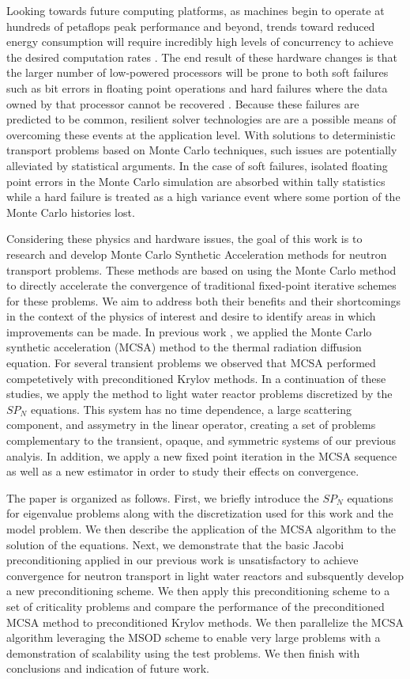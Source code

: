 \documentclass[letterpaper,11pt]{article}
\begin{document}
Looking towards future computing platforms, as machines begin to
operate at hundreds of petaflops peak performance and beyond, trends
toward reduced energy consumption will require incredibly high levels
of concurrency to achieve the desired computation rates
\cite{kogge_using_2011}. The end result of these hardware changes is
that the larger number of low-powered processors will be prone to both
soft failures such as bit errors in floating point operations and hard
failures where the data owned by that processor cannot be recovered
\cite{u.s._department_of_energy_resilient_2012}. Because these
failures are predicted to be common, resilient solver technologies are
are a possible means of overcoming these events at the application
level. With solutions to deterministic transport problems based on
Monte Carlo techniques, such issues are potentially alleviated by
statistical arguments. In the case of soft failures, isolated floating
point errors in the Monte Carlo simulation are absorbed within tally
statistics while a hard failure is treated as a high variance event
where some portion of the Monte Carlo histories lost.

Considering these physics and hardware issues, the goal of this work
is to research and develop Monte Carlo Synthetic Acceleration methods
for neutron transport problems. These methods are based on using the
Monte Carlo method to directly accelerate the convergence of
traditional fixed-point iterative schemes for these problems. We aim
to address both their benefits and their shortcomings in the context
of the physics of interest and desire to identify areas in which
improvements can be made. In previous work \cite{evans_monte_2014}, we
applied the Monte Carlo synthetic acceleration (MCSA) method to the
thermal radiation diffusion equation. For several transient problems
we observed that MCSA performed competetively with preconditioned
Krylov methods. In a continuation of these studies, we apply the
method to light water reactor problems discretized by the $SP_N$
equations. This system has no time dependence, a large scattering
component, and assymetry in the linear operator, creating a set of
problems complementary to the transient, opaque, and symmetric systems
of our previous analyis. In addition, we apply a new fixed point
iteration in the MCSA sequence as well as a new estimator in order to
study their effects on convergence.

The paper is organized as follows. First, we briefly introduce the
$SP_N$ equations for eigenvalue problems along with the discretization
used for this work and the model problem. We then describe the
application of the MCSA algorithm to the solution of the
equations. Next, we demonstrate that the basic Jacobi preconditioning
applied in our previous work is unsatisfactory to achieve convergence
for neutron transport in light water reactors and subsquently develop
a new preconditioning scheme. We then apply this preconditioning
scheme to a set of criticality problems and compare the
performance of the preconditioned MCSA method to preconditioned Krylov
methods. We then parallelize the MCSA algorithm leveraging the MSOD
scheme to enable very large problems with a demonstration of
scalability using the test problems. We then finish with conclusions
and indication of future work.
\end{document}
